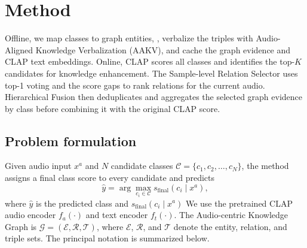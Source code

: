 \section{Method}\label{sec:method}

  Offline, we map classes to graph entities, , verbalize the triples with Audio-Aligned Knowledge Verbalization (AAKV), and cache the graph evidence and CLAP text embeddings. Online, CLAP scores all classes and identifies the top-$K$ candidates for knowledge enhancement.  The Sample-level Relation Selector uses top-1 voting and the score gaps to rank relations for the current audio. Hierarchical Fusion then deduplicates and aggregates the selected graph evidence by class before combining it with the original CLAP score.

\subsection{Problem formulation}\label{sec:problem-formulation}

Given audio input $x^a$ and $N$ candidate classes $\mathcal C=\{c_1,c_2,\ldots,c_N\}$, the method assigns a final class score to every candidate and predicts
\begin{equation}
\hat y=\arg\max_{c_i\in\mathcal C}s_{\mathrm{final}}(c_i\mid x^a),
\label{eq:prediction}
\end{equation}
where $\hat y$ is the predicted class and $s_{\mathrm{final}}(c_i\mid x^a)$  We use the pretrained CLAP audio encoder $f_a(\cdot)$ and text encoder $f_t(\cdot)$. The Audio-centric Knowledge Graph is $\mathcal G=(\mathcal E,\mathcal R,\mathcal T)$, where $\mathcal E$, $\mathcal R$, and $\mathcal T$ denote the entity, relation, and triple sets. The principal notation is summarized below.

